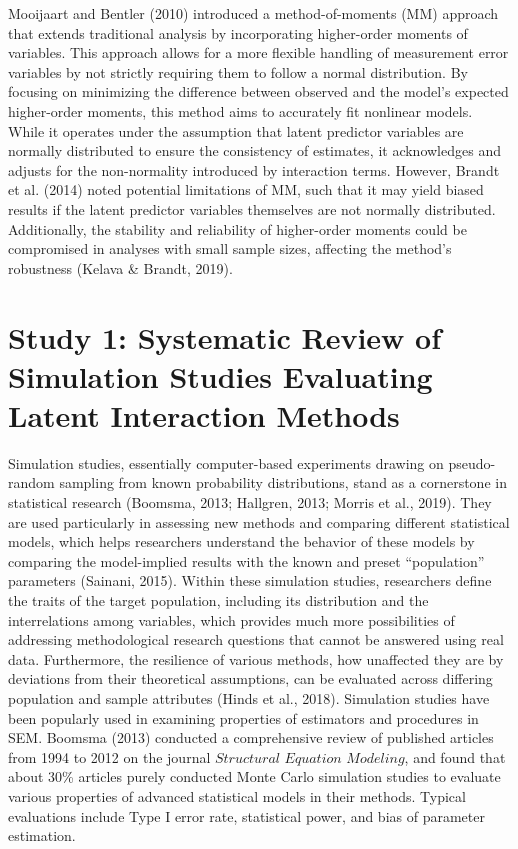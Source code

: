 \documentclass[
  man]{apa6}
\begin{document}
Mooijaart and Bentler (2010) introduced a method-of-moments (MM) approach that extends traditional analysis by incorporating higher-order moments of variables. This approach allows for a more flexible handling of measurement error variables by not strictly requiring them to follow a normal distribution. By focusing on minimizing the difference between observed and the model's expected higher-order moments, this method aims to accurately fit nonlinear models. While it operates under the assumption that latent predictor variables are normally distributed to ensure the consistency of estimates, it acknowledges and adjusts for the non-normality introduced by interaction terms. However, Brandt et al. (2014) noted potential limitations of MM, such that it may yield biased results if the latent predictor variables themselves are not normally distributed. Additionally, the stability and reliability of higher-order moments could be compromised in analyses with small sample sizes, affecting the method's robustness (Kelava \& Brandt, 2019).

\hypertarget{study-1-systematic-review-of-simulation-studies-evaluating-latent-interaction-methods}{%
\section{Study 1: Systematic Review of Simulation Studies Evaluating Latent Interaction Methods}\label{study-1-systematic-review-of-simulation-studies-evaluating-latent-interaction-methods}}

Simulation studies, essentially computer-based experiments drawing on pseudo-random sampling from known probability distributions, stand as a cornerstone in statistical research (Boomsma, 2013; Hallgren, 2013; Morris et al., 2019). They are used particularly in assessing new methods and comparing different statistical models, which helps researchers understand the behavior of these models by comparing the model-implied results with the known and preset ``population'' parameters (Sainani, 2015). Within these simulation studies, researchers define the traits of the target population, including its distribution and the interrelations among variables, which provides much more possibilities of addressing methodological research questions that cannot be answered using real data. Furthermore, the resilience of various methods, how unaffected they are by deviations from their theoretical assumptions, can be evaluated across differing population and sample attributes (Hinds et al., 2018). Simulation studies have been popularly used in examining properties of estimators and procedures in SEM. Boomsma (2013) conducted a comprehensive review of published articles from 1994 to 2012 on the journal \(\textit{Structural Equation Modeling}\), and found that about 30\% articles purely conducted Monte Carlo simulation studies to evaluate various properties of advanced statistical models in their methods. Typical evaluations include Type I error rate, statistical power, and bias of parameter estimation.
\end{document}
